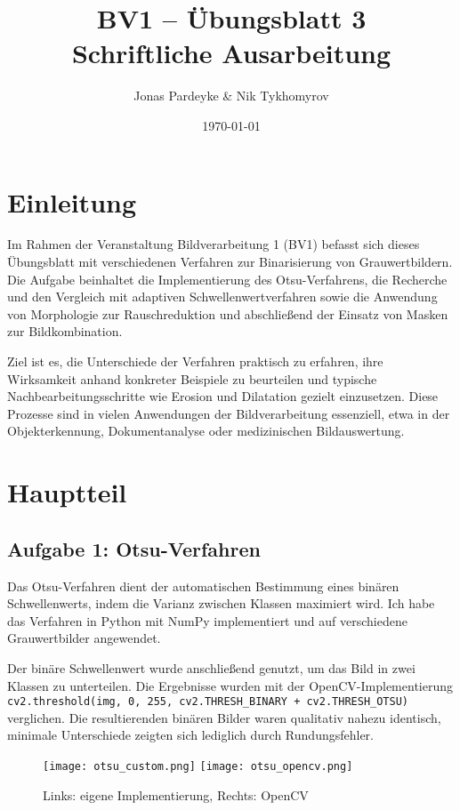 \documentclass[a4paper, fontsize=10pt, DIV=9, parskip=half, headings=small]{scrartcl}
\title{BV1 – Übungsblatt 3 \\ \large Schriftliche Ausarbeitung}
\author{Jonas Pardeyke \& Nik Tykhomyrov}
\date{\today}
\begin{document}
\maketitle 

\section{Einleitung}

Im Rahmen der Veranstaltung Bildverarbeitung 1 (BV1) befasst sich dieses Übungsblatt mit verschiedenen Verfahren zur Binarisierung von Grauwertbildern. Die Aufgabe beinhaltet die Implementierung des Otsu-Verfahrens, die Recherche und den Vergleich mit adaptiven Schwellenwertverfahren sowie die Anwendung von Morphologie zur Rauschreduktion und abschließend der Einsatz von Masken zur Bildkombination.

Ziel ist es, die Unterschiede der Verfahren praktisch zu erfahren, ihre Wirksamkeit anhand konkreter Beispiele zu beurteilen und typische Nachbearbeitungsschritte wie Erosion und Dilatation gezielt einzusetzen. Diese Prozesse sind in vielen Anwendungen der Bildverarbeitung essenziell, etwa in der Objekterkennung, Dokumentanalyse oder medizinischen Bildauswertung.

\section{Hauptteil}

\subsection{Aufgabe 1: Otsu-Verfahren}

Das Otsu-Verfahren dient der automatischen Bestimmung eines binären Schwellenwerts, indem die Varianz zwischen Klassen maximiert wird. Ich habe das Verfahren in Python mit NumPy implementiert und auf verschiedene Grauwertbilder angewendet.

Der binäre Schwellenwert wurde anschließend genutzt, um das Bild in zwei Klassen zu unterteilen. Die Ergebnisse wurden mit der OpenCV-Implementierung
\texttt{cv2.threshold(img, 0, 255, cv2.THRESH\_BINARY + cv2.THRESH\_OTSU)} verglichen. Die resultierenden binären Bilder waren qualitativ nahezu identisch, minimale Unterschiede zeigten sich lediglich durch Rundungsfehler.

\begin{figure}[H]
  \centering
  \texttt{[image: otsu\_custom.png]}
  \texttt{[image: otsu\_opencv.png]}
  \caption{Links: eigene Implementierung, Rechts: OpenCV}
\end{figure}
\end{document}
